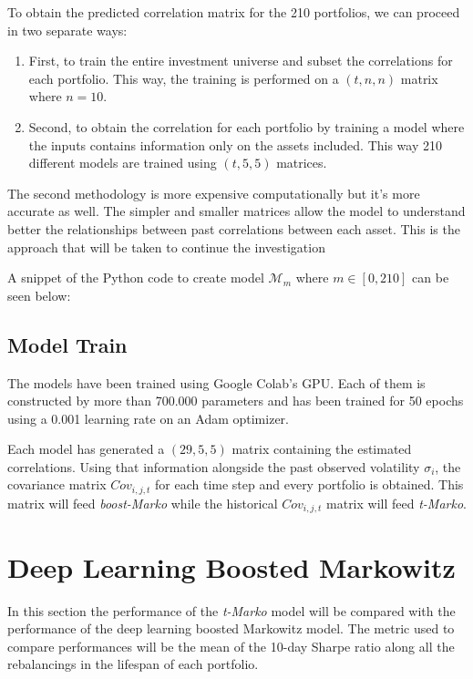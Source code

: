 \documentclass{article}
\newcommand\mat[1]{\mathcal{#1}}
\begin{document}
To obtain the predicted correlation matrix for the 210 portfolios, we can proceed in two separate ways:

\begin{enumerate}
    \item First, to train the entire investment universe and subset the correlations for each portfolio. This way, the training is performed on a $(t, n, n)$ matrix where $n = 10$.
    \item Second, to obtain the correlation for each portfolio by training a model where the inputs contains information only on the assets included. This way 210 different models are trained using $(t, 5, 5)$ matrices. 
\end{enumerate}

The second methodology is more expensive computationally but it's more accurate as well. The simpler and smaller matrices allow the model to understand better the relationships between past correlations between each asset. This is the approach that will be taken to continue the investigation

A snippet of the Python code to create model $\mat{M}_{m}$ where $m \in [0, 210]$ can be seen below:


\subsection{Model Train}
The models have been trained using Google Colab's GPU. Each of them is constructed by more than 700.000 parameters and has been trained for 50 epochs using a 0.001 learning rate on an Adam optimizer.

Each model has generated a $(29, 5 ,5)$ matrix containing the estimated correlations. Using that information alongside the past observed volatility $\sigma_{i}$, the covariance matrix $Cov_{i,j,t}$ for each time step and every portfolio is obtained. This matrix will feed \textit{boost-Marko} while the historical $Cov_{i,j,t}$ matrix will feed \textit{t-Marko}.



\section{Deep Learning Boosted Markowitz}
\label{sec5}
In this section the performance of the \textit{t-Marko} model will be compared with the performance of the deep learning boosted Markowitz model. The metric used to compare performances will be the mean of the 10-day Sharpe ratio along all the rebalancings in the lifespan of each portfolio.  
\end{document}
